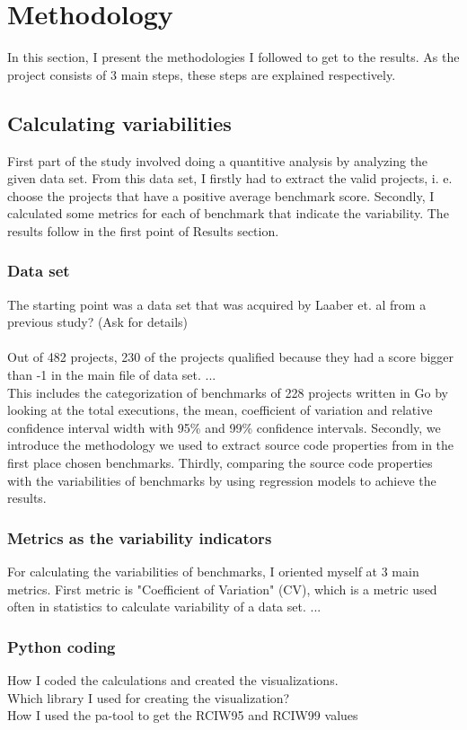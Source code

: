 \documentclass{seal_thesis}
\begin{document}
\chapter{Methodology}
\label{Methodology}
In this section, I present the methodologies I followed to get to the results. As the project consists of 3 main steps, these steps are explained respectively.
\section{Calculating variabilities}
First part of the study involved doing a quantitive analysis by analyzing the given data set. From this data set, I firstly had to extract the valid projects, i. e. choose the projects that have a positive average benchmark score. Secondly, I calculated some metrics for each of benchmark that indicate the variability. The results follow in the first point of Results section.
\subsection{Data set}
The starting point was a data set that was acquired by Laaber et. al from a previous study? (Ask for details) \\
\\
Out of 482 projects, 230 of the projects qualified because they had a score bigger than -1 in the main file of data set. ...
\\
 This includes the categorization of benchmarks of 228 projects written in Go by looking at the total executions, the mean, coefficient of variation and relative confidence interval width with 95\% and 99\% confidence intervals. Secondly, we introduce the methodology we used to extract source code properties from in the first place chosen benchmarks. Thirdly, comparing the source code properties with the variabilities of benchmarks by using regression models to achieve the results.
 
\subsection{Metrics as the variability indicators}
For calculating the variabilities of benchmarks, I oriented myself at 3 main metrics. First metric is "Coefficient of Variation" (CV), which is a metric used often in statistics to calculate variability of a data set. ...

\subsection{Python coding}
How I coded the calculations and created the visualizations. \\
Which library I used for creating the visualization? \\
How I used the pa-tool to get the RCIW95 and RCIW99 values \\
\end{document}
